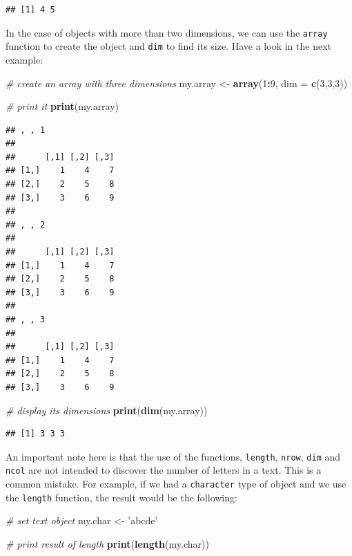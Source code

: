 \documentclass[11pt,]{book}
\newenvironment{Shaded}{\begin{snugshade}}{\end{snugshade}}
\newcommand{\KeywordTok}[1]{\textcolor[rgb]{0.27,0.27,0.27}{\textbf{#1}}}
\newcommand{\DataTypeTok}[1]{\textcolor[rgb]{0.27,0.27,0.27}{#1}}
\newcommand{\DecValTok}[1]{\textcolor[rgb]{0.06,0.06,0.06}{#1}}
\newcommand{\StringTok}[1]{\textcolor[rgb]{0.5,0.5,0.5}{#1}}
\newcommand{\CommentTok}[1]{\textcolor[rgb]{0.56,0.35,0.01}{\textit{#1}}}
\newcommand{\OperatorTok}[1]{\textcolor[rgb]{0.81,0.36,0.00}{\textbf{#1}}}
\newcommand{\NormalTok}[1]{#1}
\begin{document}
\begin{verbatim}
## [1] 4 5
\end{verbatim}

In the case of objects with more than two dimensions, we can use the
\texttt{array} function to create the object and \texttt{dim} to find
its size. Have a look in the next example:

\begin{Shaded}
\begin{Highlighting}[]
\CommentTok{# create an array with three dimensions}
\NormalTok{my.array <-}\StringTok{ }\KeywordTok{array}\NormalTok{(}\DecValTok{1}\OperatorTok{:}\DecValTok{9}\NormalTok{, }\DataTypeTok{dim =} \KeywordTok{c}\NormalTok{(}\DecValTok{3}\NormalTok{,}\DecValTok{3}\NormalTok{,}\DecValTok{3}\NormalTok{))}

\CommentTok{# print it}
\KeywordTok{print}\NormalTok{(my.array)}
\end{Highlighting}
\end{Shaded}

\begin{verbatim}
## , , 1
## 
##      [,1] [,2] [,3]
## [1,]    1    4    7
## [2,]    2    5    8
## [3,]    3    6    9
## 
## , , 2
## 
##      [,1] [,2] [,3]
## [1,]    1    4    7
## [2,]    2    5    8
## [3,]    3    6    9
## 
## , , 3
## 
##      [,1] [,2] [,3]
## [1,]    1    4    7
## [2,]    2    5    8
## [3,]    3    6    9
\end{verbatim}

\begin{Shaded}
\begin{Highlighting}[]
\CommentTok{# display its dimensions}
\KeywordTok{print}\NormalTok{(}\KeywordTok{dim}\NormalTok{(my.array))}
\end{Highlighting}
\end{Shaded}

\begin{verbatim}
## [1] 3 3 3
\end{verbatim}

An important note here is that the use of the functions,
\texttt{length}, \texttt{nrow}, \texttt{dim} and \texttt{ncol} are not
intended to discover the number of letters in a text. This is a common
mistake. For example, if we had a \texttt{character} type of object and
we use the \texttt{length} function, the result would be the following:

\begin{Shaded}
\begin{Highlighting}[]
\CommentTok{# set text object}
\NormalTok{my.char <-}\StringTok{ 'abcde'}

\CommentTok{# print result of length}
\KeywordTok{print}\NormalTok{(}\KeywordTok{length}\NormalTok{(my.char))}
\end{Highlighting}
\end{Shaded}
\end{document}
